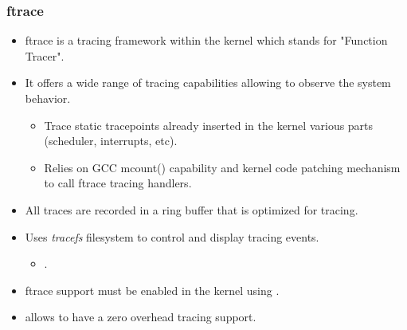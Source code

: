 \begin{frame}
  \frametitle{ftrace}
  \begin{itemize}
    \item ftrace is a tracing framework within the kernel which stands for
          "Function Tracer".
    \item It offers a wide range of tracing capabilities allowing to observe the
          system behavior.
    \begin{itemize}
      \item Trace static tracepoints already inserted in the kernel various
            parts (scheduler, interrupts, etc).
      \item Relies on GCC mcount() capability and kernel code patching mechanism
            to call ftrace tracing handlers.
    \end{itemize}
    \item All traces are recorded in a ring buffer that is optimized for tracing.
    \item Uses {\em tracefs} filesystem to control and display tracing events.
    \begin{itemize}
      \item {}.
    \end{itemize}
    \item ftrace support must be enabled in the kernel using
          .
    \item {} allows to have a zero overhead tracing
          support.
  \end{itemize}
\end{frame}

